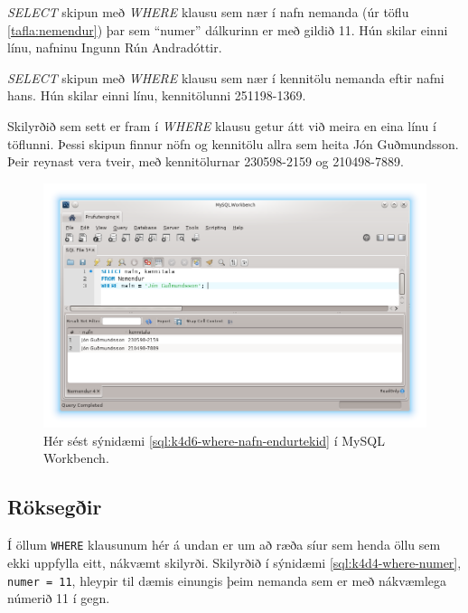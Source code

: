\begin{example}
\caption[SELECT með WHERE klausu - eftir númeri]{\emph{SELECT} skipun með \emph{WHERE} klausu sem nær í nafn nemanda (úr töflu \ref{tafla:nemendur}) þar sem ``numer'' dálkurinn er með gildið 11. Hún skilar einni línu, nafninu Ingunn Rún Andradóttir.}
\label{sql:k4d4-where-numer}
\centering
{}
\end{example}

\begin{example}
\caption[SELECT með WHERE klausu - eftir nafni]{\emph{SELECT} skipun með \emph{WHERE} klausu sem nær í kennitölu nemanda eftir nafni hans. Hún skilar einni línu, kennitölunni 251198-1369.}
\label{sql:k4d5-where-nafn}
\centering
{}
\end{example}

\begin{example}
\caption[SELECT með WHERE klausu - endurtekin gildi]{Skilyrðið sem sett er fram í \emph{WHERE} klausu getur átt við meira en eina línu í töflunni. Þessi skipun finnur nöfn og kennitölu allra sem heita Jón Guðmundsson. Þeir reynast vera tveir, með kennitölurnar 230598-2159 og 210498-7889.}
\label{sql:k4d6-where-nafn-endurtekid}
\centering
{}
\end{example}

\begin{figure}[h]
\caption[Niðurstöður margra dálka SELECT í Workbench]{Hér sést sýnidæmi \ref{sql:k4d6-where-nafn-endurtekid} í MySQL Workbench.}
\label{mynd:workbench-nidurstada-jon}
\centering
\includegraphics[width=\linewidth]{myndir/workbench-nidurstada-jon}
\end{figure}
\subsection{Röksegðir}
\label{undirkafli:roksegdir}
Í öllum \verb|WHERE| klausunum hér á undan er um að ræða síur sem henda öllu sem ekki uppfylla eitt, nákvæmt skilyrði. Skilyrðið í sýnidæmi \ref{sql:k4d4-where-numer}, \verb|numer = 11|, hleypir til dæmis einungis þeim nemanda sem er með nákvæmlega númerið 11 í gegn.

